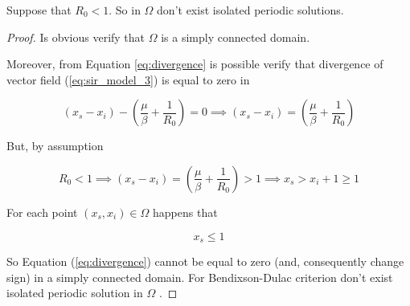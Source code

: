 \begin{theorem}
Suppose that $R_0 < 1$. So in $\Omega$ don't exist isolated periodic solutions.
\end{theorem}

\begin{proof}
Is obvious verify that $\Omega$ is a simply connected domain.

Moreover, from Equation \ref{eq:divergence} is possible verify that divergence of vector field (\ref{eq:sir_model_3}) is equal to zero in 

\begin{equation}
    (x_s - x_i) - \left(\frac{\mu}{\beta} + \frac{1}{R_0}\right) = 0 \implies (x_s - x_i) = \left(\frac{\mu}{\beta} + \frac{1}{R_0}\right) 
\end{equation}

But, by assumption

\begin{equation}
    R_0 < 1 \implies (x_s - x_i) = \left(\frac{\mu}{\beta} + \frac{1}{R_0}\right) > 1 \implies x_s > x_i + 1 \geq 1
\end{equation}

For each point $\left(x_s,x_i\right) \in \Omega$ happens that 

\begin{equation}
    x_s \leq 1
\end{equation}

So Equation (\ref{eq:divergence}) cannot be equal to zero (and, consequently change sign) in a simply connected domain. For Bendixson-Dulac criterion \cite[pp.~67]{bib:khalil} don't exist isolated periodic solution in $\Omega$ .
\end{proof}